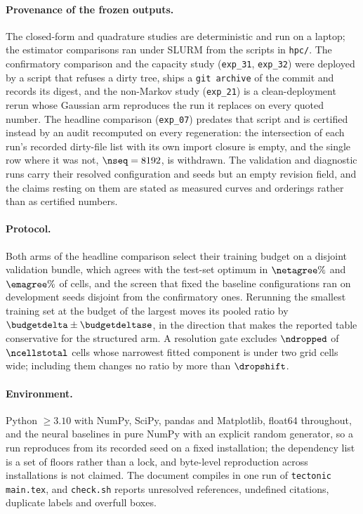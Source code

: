 \paragraph{Provenance of the frozen outputs.}
The closed-form and quadrature studies are deterministic and run on a laptop;
the estimator comparisons ran under SLURM from the scripts in \texttt{hpc/}.
The confirmatory comparison and the capacity study (\texttt{exp\_31},
\texttt{exp\_32}) were deployed by a script that refuses a dirty tree, ships a
\texttt{git archive} of the commit and records its digest, and the non-Markov
study (\texttt{exp\_21}) is a clean-deployment rerun whose Gaussian arm
reproduces the run it replaces on every quoted number. The headline
comparison (\texttt{exp\_07}) predates that script and is certified instead by
an audit recomputed on every regeneration: the intersection of each run's
recorded dirty-file list with its own import closure is empty, and the single
row where it was not, $\nseq = 8192$, is withdrawn. The validation and
diagnostic runs carry their resolved configuration and seeds but an empty
revision field, and the claims resting on them are stated as measured curves
and orderings rather than as certified numbers.

\paragraph{Protocol.}
Both arms of the headline comparison select their training budget on a
disjoint validation bundle, which agrees with the test-set optimum in
$\netagree\%$ and $\emagree\%$ of cells, and the screen that fixed the
baseline configurations ran on development seeds disjoint from the
confirmatory ones. Rerunning the smallest training set at the budget of the
largest moves its pooled ratio by $\budgetdelta \pm \budgetdeltase$, in the
direction that makes the reported table conservative for the structured arm.
A resolution gate excludes $\ndropped$ of $\ncellstotal$ cells whose narrowest
fitted component is under two grid cells wide; including them changes no ratio
by more than $\dropshift$.

\paragraph{Environment.}
Python $\ge 3.10$ with NumPy, SciPy, pandas and Matplotlib, float64
throughout, and the neural baselines in pure NumPy with an explicit random
generator, so a run reproduces from its recorded seed on a fixed
installation; the dependency list is a set of floors rather than a lock, and
byte-level reproduction across installations is not claimed. The document
compiles in one run of \texttt{tectonic main.tex}, and \texttt{check.sh}
reports unresolved references, undefined citations, duplicate labels and
overfull boxes.

